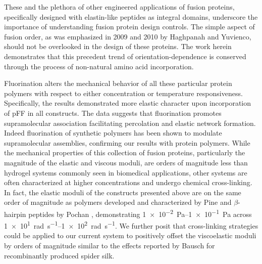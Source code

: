 \begin{refsection}
These and the plethora of other engineered applications of fusion proteins,
specifically designed with elastin-like peptides as integral domains, underscore
the importance of understanding fusion protein design controls. The simple
aspect of fusion order, as was emphasized in 2009 and 2010 by Haghpanah and
Yuvienco,\cite{Haghpanah2009,Haghpanah2010} should not be overlooked in the
design of these proteins. The work herein demonstrates that this precedent trend
of orientation-dependence is conserved through the process of non-natural amino
acid incorporation.

Fluorination alters the mechanical behavior of all these particular protein
polymers with respect to either concentration or temperature responsiveness.
Specifically, the results demonstrated more elastic character upon incorporation
of pFF in all constructs. The data suggests that fluorination promotes
supramolecular association facilitating percolation and elastic network
formation.\cite{Veerman2006,Safran1985,VanderLinden2001} Indeed fluorination of
synthetic polymers has been shown to modulate supramolecular assemblies,
confirming our results with protein
polymers.\cite{Percec2005,Krafft1993,Krafft1994,Krafft2001} While the mechanical
properties of this collection of fusion proteins, particularly the magnitude of
the elastic and viscous moduli, are orders of magnitude less than hydrogel
systems commonly seen in biomedical applications, other systems are often
characterized at higher concentrations and undergo chemical
cross-linking.\cite{Krishna2010,Yan2010a,Rammensee2008,Breedveld2004,Schneider2002}
In fact, the elastic moduli of the constructs presented above are on the same
order of magnitude as 
polymers developed and characterized by Pine  and
${\beta}$-hairpin peptides by Pochan , demonstrating
\SIrange[scientific-notation=true,retain-unity-mantissa=false]{1e-2}{1e-1}{\pascal}
across
\SIrange[scientific-notation=true,retain-unity-mantissa=false]{1e1}{1e2}{\radian\per\s}.
\cite{Breedveld2004,Yucel2008} We further posit that cross-linking strategies
could be applied to our current system to positively offset the viscoelastic
moduli by orders of magnitude similar to the effects reported by Bausch
 for recombinantly produced spider
silk.\cite{Rammensee2008,Breedveld2004,Yucel2008}


\end{refsection}
